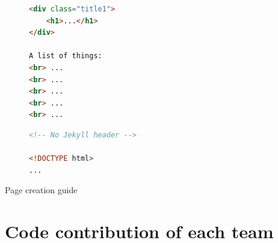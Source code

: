 \documentclass[10pt]{beamer}
\begin{document}
\begin{frame}[fragile]
\begin{figure}[h]
\begin{lstlisting}[language=html]
<div class="title1">
    <h1>...</h1>
</div>

A list of things:
<br> ...
<br> ...
<br> ...
<br> ...
<br> ...
\end{lstlisting}
\end{figure}
\end{frame}

\begin{frame}[fragile]
\begin{figure}[h]
\begin{lstlisting}[language=html]
<!-- No Jekyll header -->

<!DOCTYPE html>
...
\end{lstlisting}
\end{figure}
\end{frame}

\begin{frame}{Page creation guide}
\vfill{}\vfill
\end{frame}

\section{Code contribution of each team}
\end{document}
